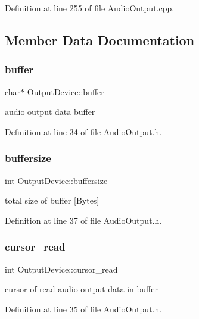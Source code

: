 Definition at line 255 of file Audio\+Output.\+cpp.



\subsection{Member Data Documentation}
\mbox{\label{class_output_device_adf56f9d3e97d766a2e2b04c7bc743ee2}} 
\subsubsection{\texorpdfstring{buffer}{buffer}}
{\footnotesize\ttfamily char$\ast$ Output\+Device\+::buffer}

audio output data buffer 

Definition at line 34 of file Audio\+Output.\+h.

\mbox{\label{class_output_device_a04e2fe4f9b7a15bf6993144d49f29461}} 
\subsubsection{\texorpdfstring{buffersize}{buffersize}}
{\footnotesize\ttfamily int Output\+Device\+::buffersize}

total size of buffer \mbox{[}Bytes\mbox{]} 

Definition at line 37 of file Audio\+Output.\+h.

\mbox{\label{class_output_device_ab49ebf067d9b6f15f2305d5028cde85e}} 
\subsubsection{\texorpdfstring{cursor\+\_\+read}{cursor\_read}}
{\footnotesize\ttfamily int Output\+Device\+::cursor\+\_\+read}

cursor of read audio output data in buffer 

Definition at line 35 of file Audio\+Output.\+h.

\mbox{\label{class_output_device_ad770c7e5e833ccd9030382e16691f331}} 
